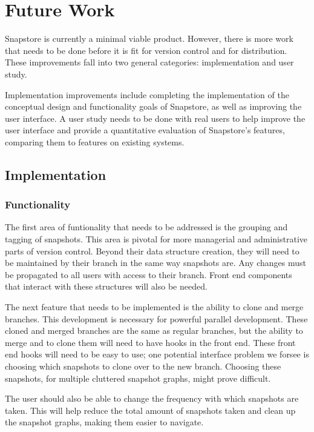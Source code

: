 \chapter{Future Work}

Snapstore is currently a minimal viable product. However, there is more work that needs to be done before it is fit for version control and for distribution. These improvements fall into two general categories: implementation and user study. 

Implementation improvements include completing the implementation of the conceptual design and functionality goals of Snapstore, as well as improving the user interface. A user study needs to be done with real users to help improve the user interface and provide a quantitative evaluation of Snapstore's features, comparing them to features on existing systems.

\section{Implementation}

\subsection{Functionality}

The first area of funtionality that needs to be addressed is the grouping and tagging of snapshots. This area is pivotal for more managerial and administrative parts of version control. Beyond their data structure creation, they will need to be maintained by their branch in the same way snapshots are. Any changes must be propagated to all users with access to their branch. Front end components that interact with these structures will also be needed.

The next feature that needs to be implemented is the ability to clone and merge branches. This development is necessary for powerful parallel development. These cloned and merged branches are the same as regular branches, but the ability to merge and to clone them will need to have hooks in the front end. These front end hooks will need to be easy to use; one potential interface problem we forsee is choosing which snapshots to clone over to the new branch. Choosing these snapshots, for multiple cluttered snapshot graphs, might prove difficult.

The user should also be able to change the frequency with which snapshots are taken. This will help reduce the total amount of snapshots taken and clean up the snapshot graphs, making them easier to navigate.

